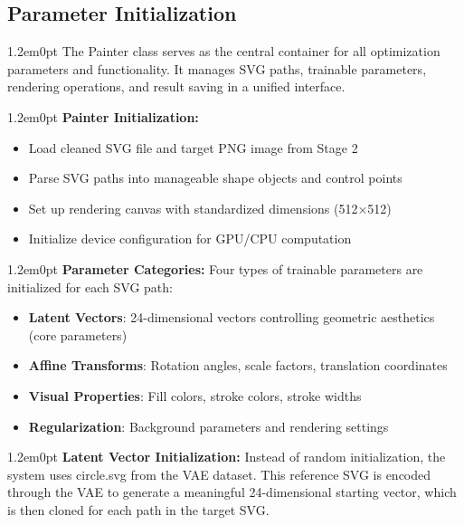 \documentclass[10pt,a4paper]{article}
\newenvironment{bodytext}{\begin{adjustwidth}{1.2em}{0pt}}{\end{adjustwidth}}
\begin{document}
\subsection{Parameter Initialization}

\begin{bodytext}
The Painter class serves as the central container for all optimization parameters and functionality. It manages SVG paths, trainable parameters, rendering operations, and result saving in a unified interface.
\end{bodytext}

\begin{bodytext}
\textbf{Painter Initialization:}
\begin{itemize}
\item Load cleaned SVG file and target PNG image from Stage 2
\item Parse SVG paths into manageable shape objects and control points
\item Set up rendering canvas with standardized dimensions (512×512)
\item Initialize device configuration for GPU/CPU computation
\end{itemize}
\end{bodytext}

\begin{bodytext}
\textbf{Parameter Categories:} Four types of trainable parameters are initialized for each SVG path:
\begin{itemize}
\item \textbf{Latent Vectors}: 24-dimensional vectors controlling geometric aesthetics (core parameters)
\item \textbf{Affine Transforms}: Rotation angles, scale factors, translation coordinates
\item \textbf{Visual Properties}: Fill colors, stroke colors, stroke widths
\item \textbf{Regularization}: Background parameters and rendering settings
\end{itemize}
\end{bodytext}

\begin{bodytext}
\textbf{Latent Vector Initialization:} Instead of random initialization, the system uses circle.svg from the VAE dataset. This reference SVG is encoded through the VAE to generate a meaningful 24-dimensional starting vector, which is then cloned for each path in the target SVG.
\end{bodytext}
\end{document}
